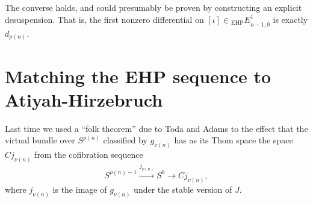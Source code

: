 The converse holds, and could presumably be proven by constructing an explicit desuspension. That is, the first nonzero differential on $[\iota]\in {_\text{EHP}E}^1_{n-1,0}$ is exactly $d_{\rho(n)}$.
\fi
\BoxedNote{}
\section{Matching the EHP sequence to Atiyah-Hirzebruch} %
\label{MatchingTheEHPSStoAtiyahHirzebruck}
\ifx\OutputMatchingTheEHPSStoAtiyahHirzebruck\undefined\else
Last time we used a ``folk theorem'' due to Toda and Adams to the effect that the virtual bundle over $S^{\rho(n)}$ classified by $g_{\nu(n)}$ has as its Thom space the space $Cj_{\nu(n)}$ from the cofibration sequence
\[
S^{\rho(n) - 1} \stackrel{j_{\nu(n)}}{\to} S^0 \to Cj_{\nu(n)}
,\]
where $j_{\nu(n)}$ is the image of $g_{\nu(n)}$ under the stable version of $J$.

